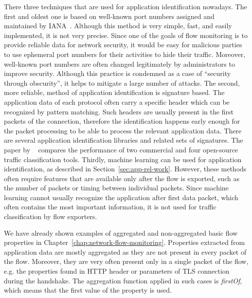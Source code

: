 There three techniques that are used for application identification nowadays. The first and oldest one is based on well-known port numbers assigned and maintained by IANA~\cite{IANA-2017-Service}. Although this method is very simple, fast, and easily implemented, it is not very precise. Since one of the goals of flow monitoring is to provide reliable data for network security, it would be easy for malicious parties to use ephemeral port numbers for their activities to hide their traffic. Moreover, well-known port numbers are often changed legitimately by administrators to improve security. Although this practice is condemned as a case of ``security through obscurity'', it helps to mitigate a large number of attacks. The second, more reliable, method of application identification is signature based. The application data of each protocol often carry a specific header which can be recognized by pattern matching. Such headers are usually present in the first packets of the connection, therefore the identification happens early enough for the packet processing to be able to process the relevant application data. There are several application identification libraries and related sets of signatures. The paper by \citeauthor{Bujlow-2015-classification}~\cite{Bujlow-2015-classification} compares the performance of two commercial and four open-source traffic classification tools. Thirdly, machine learning can be used for application identification, as described in Section~\ref{sec:app-rel-work}. However, these methods often require features that are available only after the flow is exported, such as the number of packets or timing between individual packets. Since machine learning cannot usually recognize the application after first data packet, which often contains the most important information, it is not used for traffic classification by flow exporters.

We have already shown examples of aggregated and non-aggregated basic flow properties in Chapter~\ref{chap:network-flow-monitoring}. Properties extracted from application data are mostly aggregated as they are not present in every packet of the flow. Moreover, they are very often present only in a single packet of the flow, e.g. the properties found in HTTP header or parameters of TLS connection during the handshake. The aggregation function applied in such cases is \emph{firstOf}, which means that the first value of the property is used. 

